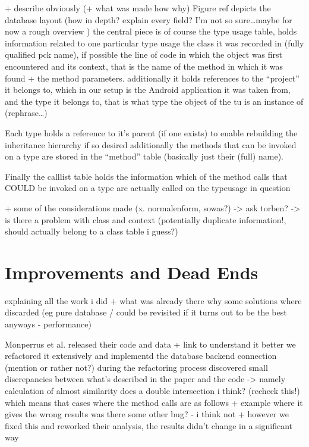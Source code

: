 + describe obviously (+ what was made how why)
Figure ref depicts the database layout
(how in depth? explain every field? I'm not so sure\ldots maybe for now a rough overview )
the central piece is of course the type usage table, holds information related to one particular type usage
the class it was recorded in (fully qualified pck name), if possible the line of code in which the object was first encountered and its context, that is the name of the method in which it was found + the method parameters.
additionally it holds references to the ``project'' it belongs to, which in our setup is the Android application it was taken from, and the type it belongs to, that is what type the object of the tu is an instance of (rephrase\ldots)

Each type holds a reference to it's parent (if one exists) to enable rebuilding the inheritance hierarchy if so desired
additionally the methods that can be invoked on a type are stored in the ``method'' table (basically just their (full) name).

Finally the calllist table holds the information which of the method calls that COULD be invoked on a type are actually called on the typeusage in question

+ some of the considerations made (x. normalenform, sowas?)
-> ask torben? -> is there a problem with class and context (potentially duplicate information!, should actually belong to a class table i guess?)

\section{Improvements and Dead Ends}\label{sec:deadends}

explaining all the work i did + what was already there
why some solutions where discarded (eg pure database / could be revisited if it turns out to be the best anyways - performance)

Monperrus et al. released their code and data + link
to understand it better we refactored it extensively and implementd the database backend connection
(mention or rather not?) during the refactoring process discovered small discrepancies between what's described in the paper and the code
-> namely calculation of almost similarity does a double intersection i think? (recheck this!)
which means that cases where the method calls are as follows + example where it gives the wrong results
was there some other bug? - i think not
+ however we fixed this and reworked their analysis, the results didn't change in a significant way

